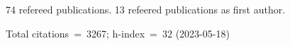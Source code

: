 74 refereed publications. 13 refeered publications as first author.

Total citations~=~3267; h-index~=~32 (2023-05-18)